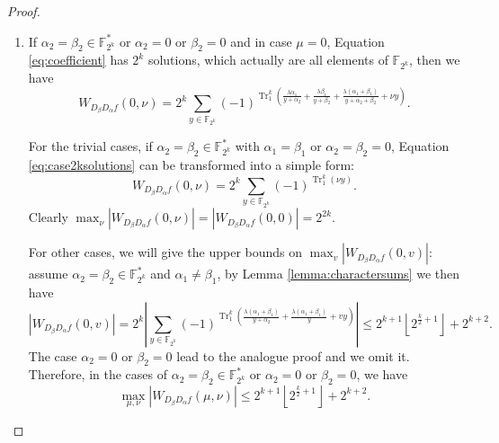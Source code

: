 \documentclass{article}
\newcommand{\F}{\mathbb{F}}
\newcommand{\0}{\textbf{0}}
\newcommand{\1}{\textbf{1}}
\newcommand{\TRACE}{\operatorname{Tr}_1^k}
\theoremstyle{plain}
\begin{document}
\begin{proof}
        \begin{enumerate}[label=\textbf{Case \arabic*},wide = 0pt]
            \item If $\alpha_2=\beta_2\in\F_{2^k}^*$ or $\alpha_2=0$ or $\beta_2=0$ and in case $\mu=0$, Equation \eqref{eq:coefficient} has $2^k$ solutions, which actually are all elements of $\F_{2^k}$, then we have
            \begin{equation}\label{eq:case2ksolutions}
                W_{D_{\beta}D_{\alpha}f}(0,\nu)=2^k\sum_{y\in\F_{2^k}}(-1)^{\TRACE\left(\frac{\lambda\alpha_1}{y+\alpha_2}+\frac{\lambda\beta_1}{y+\beta_2}+\frac{\lambda(\alpha_1+\beta_1)}{y+\alpha_2+\beta_2}+\nu y\right)}.
            \end{equation}

            For the trivial cases, if $\alpha_2=\beta_2\in\F_{2^k}^*$ with $\alpha_1=\beta_1$ or $\alpha_2=\beta_2=0$, Equation \eqref{eq:case2ksolutions} can be transformed into a simple form:
            \[W_{D_{\beta}D_{\alpha}f}(0,\nu)=2^k\sum_{y\in\F_{2^k}}(-1)^{\TRACE\left(\nu y\right)}.\]
            Clearly $\max_{\nu}|W_{D_{\beta}D_{\alpha}f}(0,\nu)|=|W_{D_{\beta}D_{\alpha}f}(0,0)|=2^{2k}$.

            For other cases, we will give the upper bounds on $\max_{v}|W_{D_{\beta}D_{\alpha}f}(0,v)|$:
            assume $\alpha_2=\beta_2\in\F_{2^k}^*$ and $\alpha_1\ne\beta_1$, by Lemma \ref{lemma:charactersums} we then have
            \[\left\lvert W_{D_{\beta}D_{\alpha}f}(0,v)\right\rvert =2^k\left\lvert \sum_{y\in\F_{2^k}}(-1)^{\TRACE\left(\frac{\lambda(\alpha_1+\beta_1)}{y+\alpha_2}+\frac{\lambda(\alpha_1+\beta_1)}{y}+vy\right)}\right\rvert\le 2^{k+1}\left\lfloor 2^{\frac{k}{2}+1}\right\rfloor+2^{k+2}.\]
            The case $\alpha_2=0$ or $\beta_2=0$ lead to the analogue proof and we omit it.
            Therefore, in the cases of $\alpha_2=\beta_2\in\F_{2^k}^*$ or $\alpha_2=0$ or $\beta_2=0$, we have
            \[\max_{\mu,\nu}|W_{D_{\beta}D_{\alpha}f}(\mu,\nu)|\le 2^{k+1}\left\lfloor 2^{\frac{k}{2}+1}\right\rfloor+2^{k+2}.\]


\end{enumerate}
\end{proof}
\end{document}
